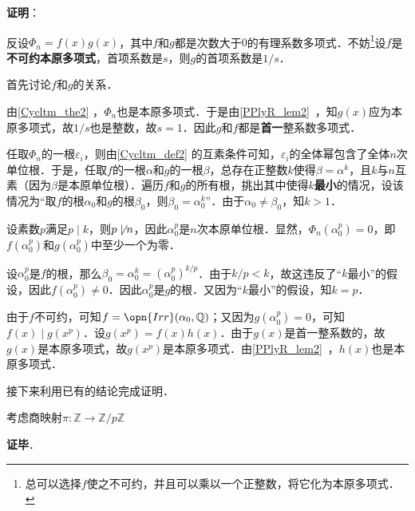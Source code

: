 \textbf{证明}：

反设$\Phi_n=f(x)g(x)$，其中$f$和$g$都是次数大于$0$的有理系数多项式．不妨\footnote{总可以选择$f$使之不可约，并且可以乘以一个正整数，将它化为本原多项式．}设$f$是\textbf{不可约本原多项式}，首项系数是$s$，则$g$的首项系数是$1/s$．

首先讨论$f$和$g$的关系．

由\autoref{Cycltm_the2} ，$\Phi_n$也是本原多项式．于是由\autoref{PPlyR_lem2}~，知$g(x)$应为本原多项式，故$1/s$也是整数，故$s=1$．因此$g$和$f$都是\textbf{首一}整系数多项式．

任取$\Phi_n$的一根$\varepsilon_i$，则由\autoref{Cycltm_def2} 的互素条件可知，$\varepsilon_i$的全体幂包含了全体$n$次单位根．于是，任取$f$的一根$\alpha$和$g$的一根$\beta$，总存在正整数$k$使得$\beta=\alpha^k$，且$k$与$n$互素（因为$\beta$是本原单位根）．遍历$f$和$g$的所有根，挑出其中使得$k$\textbf{最小}的情况，设该情况为“取$f$的根$\alpha_0$和$g$的根$\beta_0$，则$\beta_0=\alpha_0^k$”．由于$\alpha_0\neq \beta_0$，知$k>1$．

设素数$p$满足$p\mid k$，则$p\not\mid n$，因此$\alpha_0^p$是$n$次本原单位根．显然，$\Phi_n(\alpha_0^p)=0$，即$f(\alpha_0^p)$和$g(\alpha_0^p)$中至少一个为零．

设$\alpha_0^p$是$f$的根，那么$\beta_0=\alpha_0^k=(\alpha_0^p)^{k/p}$．由于$k/p<k$，故这违反了“$k$最小”的假设，因此$f(\alpha_0^p)\neq 0$．因此$\alpha_0^p$是$g$的根．又因为“$k$最小”的假设，知$k=p$．

由于$f$不可约，可知$f=\opn{Irr}(\alpha_0, \mathbb{Q})$；又因为$g(\alpha_0^p)=0$，可知$f(x)\mid g(x^p)$．设$g(x^p)=f(x)h(x)$．由于$g(x)$是首一整系数的，故$g(x)$是本原多项式，故$g(x^p)$是本原多项式．由\autoref{PPlyR_lem2}~，$h(x)$也是本原多项式．

接下来利用已有的结论完成证明．

考虑商映射$\pi:\mathbb{Z}\to\mathbb{Z}/p\mathbb{Z}$

\textbf{证毕}．























